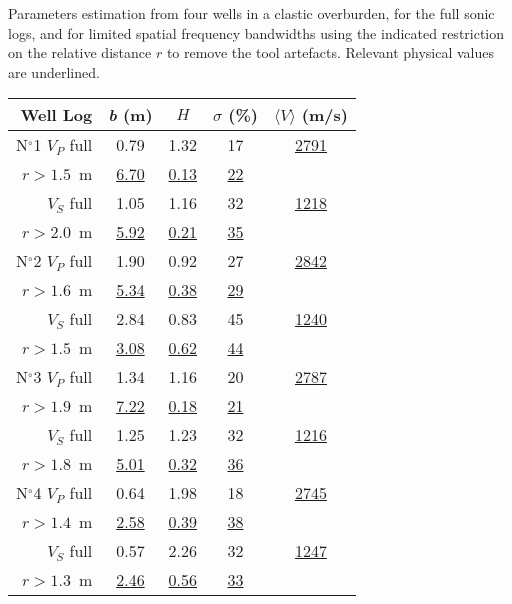 {Parameters estimation from four wells in a clastic overburden, 
for the full sonic logs, and for limited spatial frequency bandwidths 
using the indicated restriction on the relative distance $r$ to remove the tool artefacts.
Relevant physical values are underlined.}
{
\begin{center}
\begin{tabular}{|r|c|c|c|c|}
      \hline
      {Well} \hfill {Log} & {\it b} (m) & $H$ & $\sigma$ (\%) & {$\langle{V}\rangle$ (m/s)}\\[1mm]
      \hline
N$^{\circ}$1 \hspace{4mm} $V_P$ full & 0.79 & 1.32 & 17 & \underline{2791} \\
            {$r>1.5$~m} & \underline{6.70} & \underline{0.13} & \underline{22} & \\ \cline{2-5}
             $V_S$ full & 1.05 & 1.16 & 32 & \underline{1218} \\
            {$r>2.0$~m} & \underline{5.92} & \underline{0.21} & \underline{35} & \\
      \hline
N$^{\circ}$2 \hfill $V_P$ full & 1.90 & 0.92 & 27 & \underline{2842} \\
              $r>1.6$~m & \underline{5.34} & \underline{0.38} & \underline{29} & \\ \cline{2-5}
             $V_S$ full & 2.84 & 0.83 &  45 & \underline{1240} \\
              $r>1.5$~m & \underline{3.08} & \underline{0.62} & \underline{44} & \\
    \hline
N$^{\circ}$3 \hfill $V_P$ full & 1.34 & 1.16 & 20 & \underline{2787}\\
              $r>1.9$~m & \underline{7.22} & \underline{0.18} & \underline{21} & \\ \cline{2-5}
             $V_S$ full & 1.25 & 1.23 & 32 & \underline{1216} \\
              $r>1.8$~m & \underline{5.01} & \underline{0.32} & \underline{36} & \\
      \hline
N$^{\circ}$4 \hfill $V_P$ full & 0.64 & 1.98 & 18 & \underline{2745} \\
              $r>1.4$~m & \underline{2.58} & \underline{0.39} & \underline{38} & \\ \cline{2-5}
             $V_S$ full & 0.57 & 2.26 & 32 & \underline{1247} \\
              $r>1.3$~m & \underline{2.46} & \underline{0.56} & \underline{33} & \\
     \hline
\end{tabular}
\end{center}
}



